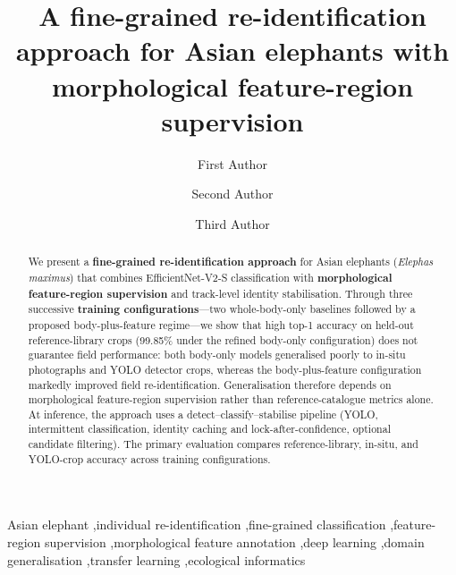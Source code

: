 \documentclass[preprint,12pt,3p,times]{elsarticle}
\begin{document}
\begin{frontmatter}

\title{A fine-grained re-identification approach for Asian elephants with morphological feature-region supervision}

\author[inst1]{First Author}
\author[inst1]{Second Author}

\author[inst2]{Third Author}

\address[inst1]{Department of [PLACEHOLDER], [University], [City], [Country]}
\address[inst2]{[Facility / Research Centre], [City], [Country]}


\begin{abstract}
We present a \textbf{fine-grained re-identification approach} for Asian elephants (\textit{Elephas maximus}) that combines EfficientNet-V2-S classification with \textbf{morphological feature-region supervision} and track-level identity stabilisation. Through three successive \textbf{training configurations}---two whole-body-only baselines followed by a proposed body-plus-feature regime---we show that high top-1 accuracy on held-out reference-library crops (99.85\% under the refined body-only configuration) does not guarantee field performance: both body-only models generalised poorly to in-situ photographs and YOLO detector crops, whereas the body-plus-feature configuration markedly improved field re-identification. Generalisation therefore depends on morphological feature-region supervision rather than reference-catalogue metrics alone. At inference, the approach uses a detect--classify--stabilise pipeline (YOLO, intermittent classification, identity caching and lock-after-confidence, optional candidate filtering). The primary evaluation compares reference-library, in-situ, and YOLO-crop accuracy across training configurations.
\end{abstract}

\begin{keyword}
Asian elephant \sep individual re-identification \sep fine-grained classification \sep feature-region supervision \sep morphological feature annotation \sep deep learning \sep domain generalisation \sep transfer learning \sep ecological informatics
\end{keyword}

\end{frontmatter}


\end{document}
